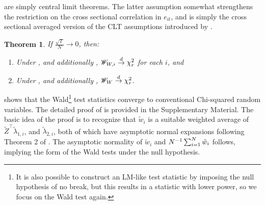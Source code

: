 \documentclass[12pt]{article}
\newtheorem{theorem}{Theorem}[section]
\newcommand*{\tran}{\intercal}
\theoremstyle{plain}
\numberwithin{equation}{section}
\begin{document}
 are simply central limit theorems. The latter assumption somewhat strengthens the restriction on the cross sectional correlation in $e_{it}$, and is simply the cross sectional averaged version of the CLT assumptions introduced by \textcite{bai_inferential_2003}. 
\begin{theorem}
\label{thm:W_test_distribution}
If $\frac{\sqrt{T}}{N} \to 0$, then:
\begin{enumerate}
\item \label{thm:W_test_distribution:1}
Under , and additionally , $\mathscr{W}_{W, i} \overset{d}{\to} \chi^2_{r}$ for each $i$, and
\item \label{thm:W_test_distribution:2} 
Under , and additionally ,
$\mathscr{W}_{W} \overset{d}{\to} \chi^2_{r}$.
\end{enumerate}
\end{theorem}
 shows that the Wald\footnote{It is also possible to construct an LM-like test statistic by imposing the null hypothesis of no break, but this results in a statistic with lower power, so we focus on the Wald test again.} test statistics converge to conventional Chi-squared random variables. The detailed proof of  is provided in the Supplementary Material. The basic idea of the proof is to recognize that $\tilde{w}_i$ is a suitable weighted average of $\tilde{Z}^\tran \tilde{\lambda}_{1, i}$, and $\tilde{\lambda}_{2, i}$, both of which have asymptotic normal expansions following Theorem 2 of \textcite{bai_inferential_2003}. The asymptotic normality of $\tilde{w}_i$ and $N^{-1} \sum_{i = 1}^{N} \tilde{w}_i$ follows, implying the form of the Wald tests under the null hypothesis.
\end{document}
